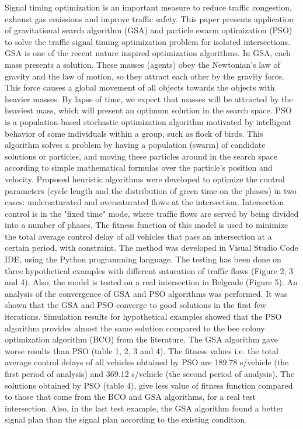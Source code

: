 \begin{AbstractEng}
Signal timing optimization is an important measure to reduce traffic congestion, exhaust gas emissions and improve traffic safety. This paper presents application of gravitational search algorithm (GSA) and particle swarm optimization (PSO) to solve the traffic signal timing optimization problem for isolated intersections. GSA is one of the recent nature inspired optimization algorithms. In GSA, each mass presents a solution. These masses (agents) obey the Newtonian's law of gravity and the law of motion, so they attract each other by the gravity force. This force causes a global movement of all objects towards the objects with heavier masses. By lapse of time, we expect that masses will be attracted by the heaviest mass, which will present an optimum solution in the search space. PSO is a population-based stochastic optimization algorithm motivated by intelligent behavior of some individuals within a group, such as flock of birds. This algorithm solves a problem by having a population (swarm) of candidate solutions or particles, and moving these particles around in the search space according to simple mathematical formulas over the particle's position and velocity. Proposed heuristic algorithms were developed to optimize the control parameters (cycle length and the distribution of green time on the phases) in two cases: undersaturated and oversaturated flows at the intersection. Intersection control is in the "fixed time" mode, where traffic flows are served by being divided into a number of phases. The fitness function of this model is used to minimize the total average control delay of all vehicles that pass an intersection at a certain period, with constraint. The method was developed in Visual Studio Code IDE, using the Python programming language. The testing has been done on three hypothetical examples with different saturation of traffic flows (Figure 2, 3 and 4). Also, the model is tested on a real intersection in Belgrade (Figure 5). An analysis of the convergence of GSA and PSO algorithms was performed. It was shown that the GSA and PSO converge to good solutions in the first few iterations. Simulation results for hypothetical examples showed that the PSO algorithm provides almost the same solution compared to the bee colony optimization algorithm (BCO) from the literature. The GSA algorithm gave worse results than PSO (table 1, 2, 3 and 4). The fitness values i.e. the total average control delays of all vehicles obtained by PSO are 189.78 s/vehicle (the first period of analysis) and 369.12 s/vehicle (the second period of analysis). The solutions obtained by PSO (table 4), give less value of fitness function compared to those that come from the BCO and GSA algorithms, for a real test intersection. Also, in the last test example, the GSA algorithm found a better signal plan than the signal plan according to the existing condition. 
\end{AbstractEng}
\StartDoublePaper
\label{rac.aleksandra}

